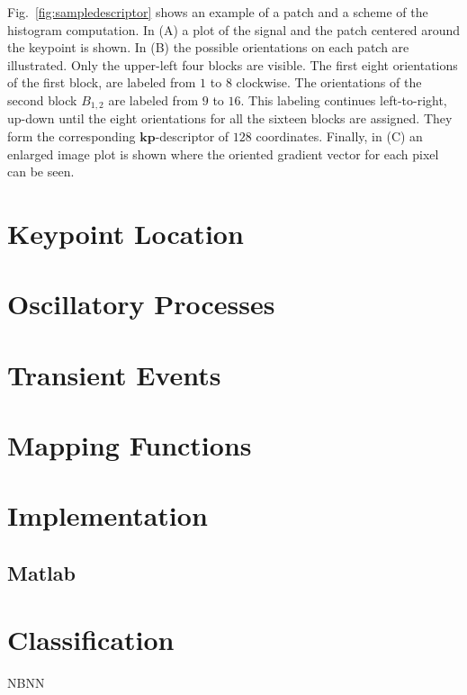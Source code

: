 Fig.~\ref{fig:sampledescriptor} shows an example of a patch and a scheme of the histogram computation. In (A) a plot of the signal and the patch centered around the keypoint is shown. In (B) the possible orientations on each patch are illustrated.  Only the upper-left four blocks are visible.  The first eight orientations of the first block, are labeled from $1$ to $8$ clockwise. The orientations of the second block $ B_{1,2} $ are labeled from $9$ to $16$.  This labeling continues left-to-right, up-down until the eight orientations for all the sixteen blocks are assigned. They form the corresponding $\mathbf{kp}$-descriptor of $128$ coordinates. Finally, in (C) an enlarged image plot is shown where the oriented gradient vector for each pixel can be seen.

\section{Keypoint Location}

\section{Oscillatory Processes}

\section{Transient Events}

\section{Mapping Functions}

\section{Implementation}

\subsection{Matlab}

\section{Classification}

NBNN
